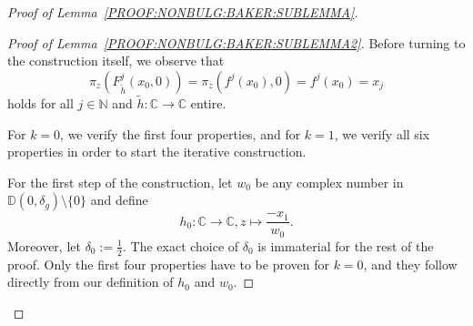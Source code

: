 \documentclass[a4paper, 12pt, twoside]{amsart}
\theoremstyle{definition}
\numberwithin{equation}{section}
\newcommand{\C}{{\mathbb C}}
\newcommand{\D}{{\mathbb D}}
\newcommand{\N}{{\mathbb N}}
\begin{document}
\begin{proof}[Proof of Lemma~\ref{PROOF:NONBULG:BAKER:SUBLEMMA}]
        
        \begin{proof}[Proof of Lemma~\ref{PROOF:NONBULG:BAKER:SUBLEMMA2}]
            Before turning to the construction itself, we observe that
            \begin{equation}\label{EQ:ZeroSpecialCase}
                \pi_z( F^{j}_{\widetilde{h}}(x_0, 0)) = \pi_z (f^{j}(x_0),0) = f^{j}(x_0) = x_{j}
            \end{equation}
            holds for all $j \in \N$ and $\tilde{h} : \C \to \C$ entire.

            For $k=0$, we verify the first four properties, and for $k = 1$, we verify all six properties in order to start the iterative construction.

            For the first step of the construction, let $w_0$ be any complex number in $\D(0,\delta_g)\setminus\{0\}$ and define 
            \begin{equation*}
                h_0 : \C \to \C, z \mapsto \frac{-x_1}{w_0}.
            \end{equation*} 
            Moreover, let $\delta_0 := \frac{1}{2}$. The exact choice of $\delta_0$ is immaterial for the rest of the proof. Only the first four properties have to be proven for $k = 0$, and they follow directly from our definition of $h_0$ and $w_0$. 


\end{proof}
\end{proof}
\end{document}
